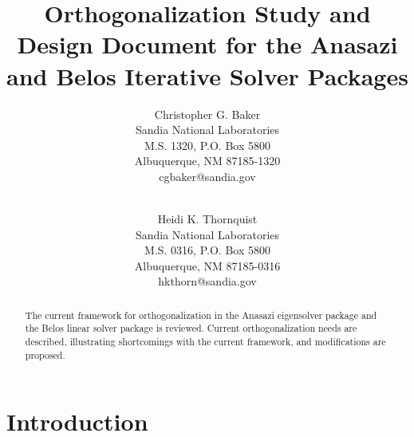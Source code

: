 \documentclass[12pt,letterpaper]{SANDreport}
\title{Orthogonalization Study and Design Document for the Anasazi and Belos
Iterative Solver Packages}
\author{Christopher G. Baker \\
Sandia National Laboratories\\
M.S. 1320, P.O. Box 5800\\
Albuquerque, NM 87185-1320 \\
cgbaker@sandia.gov \\
\\
\and
Heidi K. Thornquist \\
Sandia National Laboratories \\
M.S. 0316, P.O. Box 5800\\
Albuquerque, NM 87185-0316 \\
hkthorn@sandia.gov
}
\date{}
\theoremstyle{example}
\newcommand{\range}[1]{\mathcal{R}(#1)}
\begin{document}
\maketitle

%
\begin{abstract}
  The current framework for orthogonalization in the Anasazi eigensolver package and the
  Belos linear solver package is reviewed. Current orthogonalization needs are described,
  illustrating shortcomings with the current framework, and modifications are proposed.
\end{abstract}



%
\cleardoublepage		%
\tableofcontents





%
\SANDmain		%


\section{Introduction}
\end{document}
